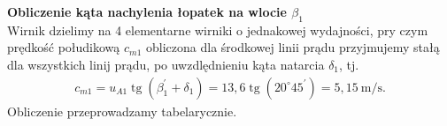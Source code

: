 \documentclass[a4paper]{book}
\DeclareMathOperator{\tg}{tg}
\begin{document}
%
\textbf{Obliczenie kąta nachylenia łopatek na wlocie $\beta_1$} \\
%
Wirnik dzielimy na 4 elementarne wirniki o jednakowej wydajności, pry czym prędkość połudikową $c_{m1}$ obliczona dla środkowej linii prądu przyjmujemy stałą dla wszystkich linij prądu, po uwzdlędnieniu kąta natarcia $\delta_1$, tj.
\begin{gather*}
%
c_{m1} = u_{A1}\tg(\beta_1^\prime + \delta_1) = 13{,}6\tg(20^{\circ}45^\prime) = 5{,}15 \: \text{m/s}.
%
\end{gather*}
Obliczenie przeprowadzamy tabelarycznie. 
\vspace*{-\baselineskip}
\end{document}

